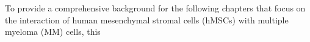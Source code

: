 

To provide a comprehensive background for the following chapters that
focus on the interaction of human mesenchymal
stromal cells (hMSCs) with multiple myeloma (MM) cells, this



